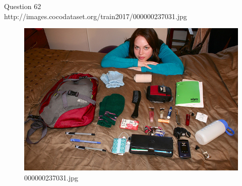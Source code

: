 Question 62\\
http://images.cocodataset.org/train2017/000000237031.jpg
\begin{figure}[h]
    \centering
    \includegraphics[width=0.8\linewidth]{../image set/hard/000000237031.jpg}
    \caption{000000237031.jpg}
\end{figure}
